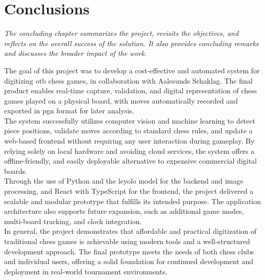 \chapter{Conclusions}

\begin{center}
    \textit{The concluding chapter summarizes the project, revisits the objectives, and reflects on the overall success of the solution. It also provides concluding remarks and discusses the broader impact of the work.}
\end{center}

The goal of this project was to develop a cost-effective and automated system for digitizing \gls{otb} chess games, in collaboration with Aalesunds Schaklag. The final product enables real-time capture, validation, and digital representation of chess games played on a physical board, with moves automatically recorded and exported in \gls{pgn} format for later analysis. \\

The system successfully utilizes computer vision and machine learning to detect piece positions, validate moves according to standard chess rules, and update a web-based frontend without requiring any user interaction during gameplay. By relying solely on local hardware and avoiding cloud services, the system offers a offline-friendly, and easily deployable alternative to expensive commercial digital boards. \\

Through the use of Python and the \gls{leyolo} model for the backend and image processing, and React with TypeScript for the frontend, the project delivered a scalable and modular prototype that fulfills its intended purpose. The application architecture also supports future expansion, such as additional game modes, multi-board tracking, and clock integration. \\

In general, the project demonstrates that affordable and practical digitization of traditional chess games is achievable using modern tools and a well-structured development approach. The final prototype meets the needs of both chess clubs and individual users, offering a solid foundation for continued development and deployment in real-world tournament environments.